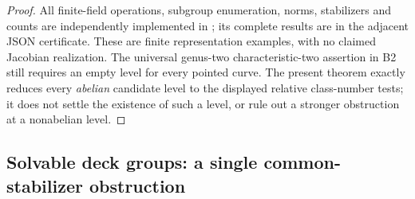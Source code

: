 \documentclass[11pt,a4paper]{article}
\begin{document}
\begin{proof}
All finite-field operations, subgroup enumeration, norms,
stabilizers and counts are independently implemented in
; its complete results
are in the adjacent JSON certificate. These are finite
representation examples, with no claimed Jacobian realization.
The universal genus-two characteristic-two assertion in B2
still requires an empty level for every pointed curve. The
present theorem exactly reduces every \emph{abelian} candidate
level to the displayed relative class-number tests; it does
not settle the existence of such a level, or rule out a
stronger obstruction at a nonabelian level.
\end{proof}


\subsection{Solvable deck groups: a single common-stabilizer obstruction}
\end{document}
